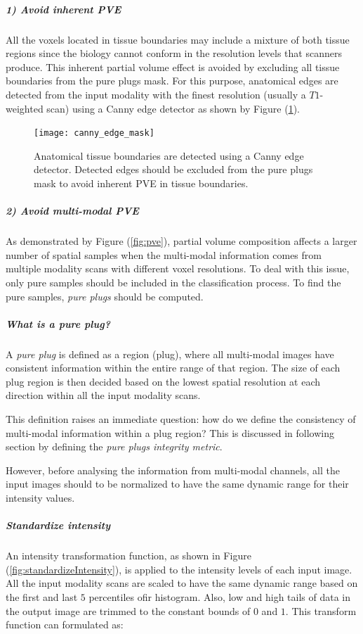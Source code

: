 \subparagraph*{1) Avoid inherent PVE}
All the voxels located in tissue boundaries may include a mixture of both tissue regions since the biology cannot conform in the resolution levels that scanners produce. This inherent partial volume effect is avoided by excluding all tissue boundaries from the pure plugs mask. For this purpose, anatomical edges are detected from the input modality with the finest resolution (usually a $T1$-weighted scan) using a Canny edge detector \cite{canny1986} as shown by Figure (\ref{fig:canny_edge_mask}).

\begin{figure}
\centering
\texttt{[image: canny\_edge\_mask]}\
\centering
\caption{Anatomical tissue boundaries are detected using a Canny edge detector. Detected edges should be excluded from the pure plugs mask to avoid inherent PVE in tissue boundaries.}
\label{fig:canny_edge_mask}
\end{figure}

\subparagraph*{2) Avoid multi-modal PVE}
As demonstrated by Figure (\ref{fig:pve}), partial  volume  composition  affects  a  larger  number  of  spatial  samples  when  the  multi-modal  information comes from multiple modality scans with different voxel resolutions.
To deal with this issue, only pure samples should be included in the classification process. To find the pure samples, \textit{pure plugs} should be computed.

\subparagraph*{What is a pure plug?}
A \textit{pure plug} is defined as a region (plug), where all multi-modal images have consistent information within the entire range of that region. The size of each plug region is then decided based on the lowest spatial resolution at each direction within all the input modality scans.

This definition raises an immediate question: how do we define the consistency of multi-modal information within a plug region? This is discussed in following section by defining the \textit{pure plugs integrity metric}.

However, before analysing the information from multi-modal channels, all the input images should to be normalized to have the same dynamic range for their intensity values.

\subparagraph*{Standardize intensity}

An intensity transformation function, as shown in Figure (\ref{fig:standardizeIntensity}), is applied to the intensity levels of each input image. All the input modality scans are scaled to have the same dynamic range based on the first and last $5$ percentiles ofir histogram. Also, low and high tails of data in the output image are trimmed to the constant bounds of $0$ and $1$. This transform function can formulated as:


